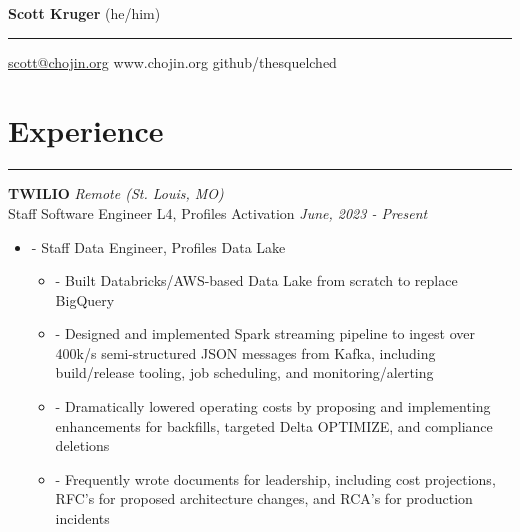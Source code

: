 \documentclass[a4paper,11pt]{article}
\newenvironment{pitemize}{
\begin{itemize}
\setlength{\itemsep}{.01in}
\setlength{\parskip}{.01in}
}
{\end{itemize}}
\begin{document}
\Huge{\textbf{Scott Kruger}} \hfill \normalsize{(he/him)}
\hrule
\vspace{0.05in}
\normalsize{
    \href{mailto:scott@chojin.org}{scott@chojin.org} 
    \hfill www.chojin.org \hfill github/thesquelched
}

\section*{\huge{Experience}}
\hrule
\vspace{0.1in}

\textbf{TWILIO} \hfill \textit{Remote (St. Louis, MO)} \\
Staff Software Engineer L4, Profiles Activation \hfill \textit{June, 2023 - Present}
\begin{pitemize}
    \item[-]Staff Data Engineer, Profiles Data Lake
    \begin{pitemize}
        \item[-]Built Databricks/AWS-based Data Lake from scratch to replace BigQuery
        \item[-]Designed and implemented Spark streaming pipeline to ingest over 400k/s semi-structured JSON messages from Kafka, including build/release tooling, job scheduling, and monitoring/alerting
        \item[-]Dramatically lowered operating costs by proposing and implementing enhancements for backfills, targeted Delta OPTIMIZE, and compliance deletions
        \item[-]Frequently wrote documents for leadership, including cost projections, RFC's for proposed architecture changes, and RCA's for production incidents
    \end{pitemize}
\end{pitemize}
\end{document}

